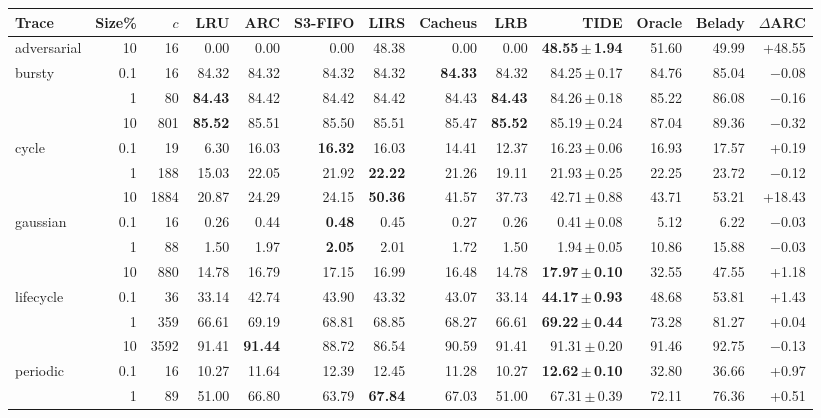 \begin{tabular}{lrrrrrrrrrrrr}
\toprule
Trace & Size\% & $c$ & LRU & ARC & S3-FIFO & LIRS & Cacheus & LRB & TIDE & Oracle & Belady & $\Delta$ARC \\
\midrule
adversarial & 10 & 16 & 0.00 & 0.00 & 0.00 & 48.38 & 0.00 & 0.00 & \textbf{48.55\,$\pm$\,1.94} & 51.60 & 49.99 & +48.55 \\
\midrule
bursty & 0.1 & 16 & 84.32 & 84.32 & 84.32 & 84.32 & \textbf{84.33} & 84.32 & 84.25\,$\pm$\,0.17 & 84.76 & 85.04 & $-$0.08 \\
 & 1 & 80 & \textbf{84.43} & 84.42 & 84.42 & 84.42 & 84.43 & \textbf{84.43} & 84.26\,$\pm$\,0.18 & 85.22 & 86.08 & $-$0.16 \\
 & 10 & 801 & \textbf{85.52} & 85.51 & 85.50 & 85.51 & 85.47 & \textbf{85.52} & 85.19\,$\pm$\,0.24 & 87.04 & 89.36 & $-$0.32 \\
\midrule
cycle & 0.1 & 19 & 6.30 & 16.03 & \textbf{16.32} & 16.03 & 14.41 & 12.37 & 16.23\,$\pm$\,0.06 & 16.93 & 17.57 & +0.19 \\
 & 1 & 188 & 15.03 & 22.05 & 21.92 & \textbf{22.22} & 21.26 & 19.11 & 21.93\,$\pm$\,0.25 & 22.25 & 23.72 & $-$0.12 \\
 & 10 & 1884 & 20.87 & 24.29 & 24.15 & \textbf{50.36} & 41.57 & 37.73 & 42.71\,$\pm$\,0.88 & 43.71 & 53.21 & +18.43 \\
\midrule
gaussian & 0.1 & 16 & 0.26 & 0.44 & \textbf{0.48} & 0.45 & 0.27 & 0.26 & 0.41\,$\pm$\,0.08 & 5.12 & 6.22 & $-$0.03 \\
 & 1 & 88 & 1.50 & 1.97 & \textbf{2.05} & 2.01 & 1.72 & 1.50 & 1.94\,$\pm$\,0.05 & 10.86 & 15.88 & $-$0.03 \\
 & 10 & 880 & 14.78 & 16.79 & 17.15 & 16.99 & 16.48 & 14.78 & \textbf{17.97\,$\pm$\,0.10} & 32.55 & 47.55 & +1.18 \\
\midrule
lifecycle & 0.1 & 36 & 33.14 & 42.74 & 43.90 & 43.32 & 43.07 & 33.14 & \textbf{44.17\,$\pm$\,0.93} & 48.68 & 53.81 & +1.43 \\
 & 1 & 359 & 66.61 & 69.19 & 68.81 & 68.85 & 68.27 & 66.61 & \textbf{69.22\,$\pm$\,0.44} & 73.28 & 81.27 & +0.04 \\
 & 10 & 3592 & 91.41 & \textbf{91.44} & 88.72 & 86.54 & 90.59 & 91.41 & 91.31\,$\pm$\,0.20 & 91.46 & 92.75 & $-$0.13 \\
\midrule
periodic & 0.1 & 16 & 10.27 & 11.64 & 12.39 & 12.45 & 11.28 & 10.27 & \textbf{12.62\,$\pm$\,0.10} & 32.80 & 36.66 & +0.97 \\
 & 1 & 89 & 51.00 & 66.80 & 63.79 & \textbf{67.84} & 67.03 & 51.00 & 67.31\,$\pm$\,0.39 & 72.11 & 76.36 & +0.51 \\

\end{tabular}
